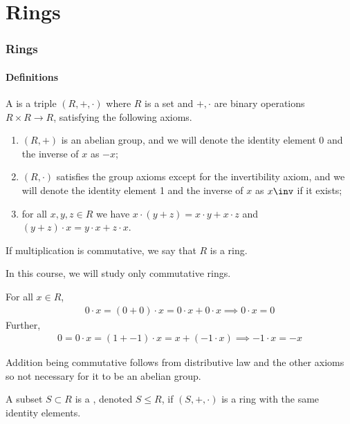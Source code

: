 \part{Rings}

\section{Rings}

\subsection{Definitions}
\begin{definition}[Ring]
	A  is a triple $(R, +, \cdot)$ where $R$ is a set and $+, \cdot$ are binary operations $R \times R \to R$, satisfying the following axioms.
	\begin{enumerate}
		\item $(R, +)$ is an abelian group, and we will denote the identity element 0 and the inverse of $x$ as $-x$;
		\item $(R, \cdot)$ satisfies the group axioms except for the invertibility axiom, and we will denote the identity element 1 and the inverse of $x$ as $x\inv$ if it exists;
		\item for all $x, y, z \in R$ we have $x \cdot (y+z) = x\cdot y + x\cdot z$ and $(y+z)\cdot x = y \cdot x + z \cdot x$.
	\end{enumerate}
	If multiplication is commutative, we say that $R$ is a  ring.
\end{definition}

In this course, we will study only commutative rings.

\begin{remark}
	For all $x \in R$,
	\begin{align*}
		0 \cdot x = (0+0) \cdot x = 0 \cdot x + 0 \cdot x \implies 0 \cdot x = 0
	\end{align*}
	Further,
	\begin{align*}
		0 = 0 \cdot x = (1 + -1) \cdot x = x + (-1 \cdot x) \implies -1 \cdot x = -x
	\end{align*}
\end{remark}

\begin{remark}
	Addition being commutative follows from distributive law and the other axioms so not necessary for it to be an abelian group.
\end{remark} 

\begin{definition}[Subring]
	A subset $S \subset R$ is a , denoted $S \leq R$, if $(S, +, \cdot)$ is a ring with the same identity elements.
\end{definition}

